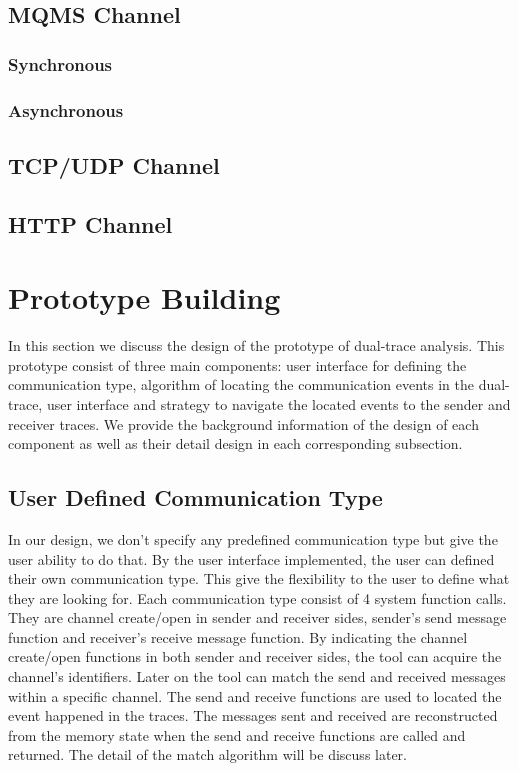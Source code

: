 \documentclass[paper=a4, fontsize=11pt]{scrartcl}
\numberwithin{equation}{section}		%
\numberwithin{figure}{section}			%
\numberwithin{table}{section}				%
\begin{document}
\subsection{MQMS Channel}
\subsubsection{Synchronous}
\subsubsection{Asynchronous}

\subsection{TCP/UDP Channel}
\subsection{HTTP Channel}

\section{Prototype Building}
In this section we discuss the design of the prototype of dual-trace analysis. This prototype consist of three main components: user interface for defining the communication type, algorithm of locating the communication events in the dual-trace, user interface and strategy to navigate the located events to the sender and receiver traces. We provide the background information of the design of each component as well as their detail design in each corresponding subsection.
\subsection{User Defined Communication Type}
In our design, we don't specify any predefined communication type but give the user ability to do that. By the user interface implemented, the user can defined their own communication type. This give the flexibility to the user to define what they are looking for. Each communication type consist of 4 system function calls. They are channel create/open in sender and receiver sides, sender's send message function and receiver's receive message function. By indicating the channel create/open functions in both sender and receiver sides, the tool can acquire the channel's identifiers. Later on the tool can match the send and received messages within a specific channel. The send and receive functions are used to located the event happened in the traces. The messages sent and received are reconstructed from the memory state when the send and receive functions are called and returned. The detail of the match algorithm will be discuss later.
\end{document}
